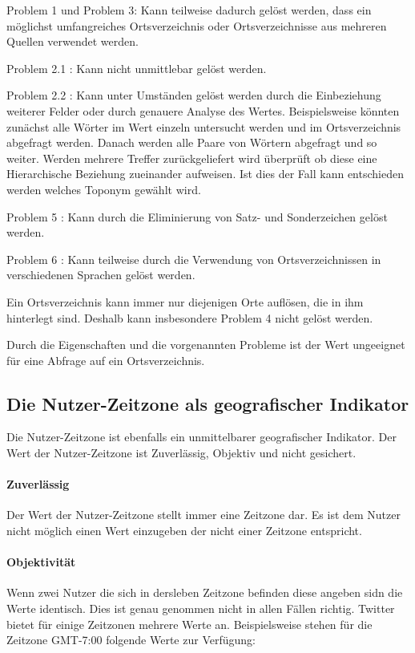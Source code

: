 				Problem 1 und Problem 3: Kann teilweise dadurch gelöst werden, dass ein möglichst umfangreiches Ortsverzeichnis oder Ortsverzeichnisse aus mehreren Quellen verwendet werden.   
				
				Problem 2.1 : Kann nicht unmittlebar gelöst werden.
				
				Problem 2.2 : Kann unter Umständen gelöst werden durch die Einbeziehung weiterer Felder oder durch genauere Analyse des Wertes. 
				Beispielsweise könnten zunächst alle Wörter im Wert einzeln untersucht werden und im Ortsverzeichnis abgefragt werden. 
				Danach werden alle Paare von Wörtern abgefragt und so weiter. 
				Werden mehrere Treffer zurückgeliefert wird überprüft ob diese eine Hierarchische Beziehung zueinander aufweisen. 
				Ist dies der Fall kann entschieden werden welches Toponym gewählt wird.     
				
				Problem 5 : Kann durch die Eliminierung von Satz- und Sonderzeichen gelöst werden. 
				
				Problem 6 : Kann teilweise durch die Verwendung von Ortsverzeichnissen in verschiedenen Sprachen gelöst werden. 

				Ein Ortsverzeichnis kann immer nur diejenigen Orte auflösen, die in ihm hinterlegt sind.
				Deshalb kann insbesondere Problem 4 nicht gelöst werden.

				Durch die Eigenschaften und die vorgenannten Probleme ist der Wert ungeeignet für eine Abfrage auf ein Ortsverzeichnis.  


			\subsection{Die Nutzer-Zeitzone als geografischer Indikator}

				Die Nutzer-Zeitzone ist ebenfalls ein unmittelbarer geografischer Indikator. 
				Der Wert der Nutzer-Zeitzone ist Zuverlässig, Objektiv und nicht gesichert. 
				
				\paragraph{Zuverlässig}
					Der Wert der Nutzer-Zeitzone stellt immer eine Zeitzone dar.
					Es ist dem Nutzer nicht möglich einen Wert einzugeben der nicht einer Zeitzone entspricht.

				\paragraph{Objektivität}
					Wenn zwei Nutzer die sich in dersleben Zeitzone befinden diese angeben sidn die Werte identisch.
					Dies ist genau genommen nicht in allen Fällen richtig.
					Twitter bietet für einige Zeitzonen mehrere Werte an. 
					Beispielsweise stehen für die Zeitzone GMT-7:00 folgende Werte zur Verfügung:

